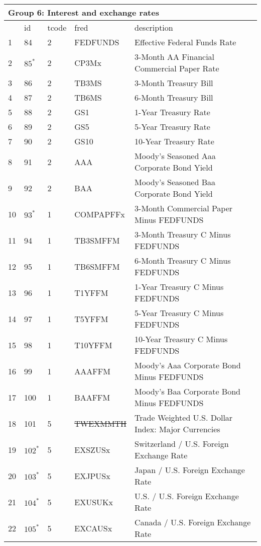 \begin{table}[ht] 
\centering 
\begin{tabular}{lllll}
\multicolumn{5}{l}{Group 6: Interest and exchange rates} \\
\toprule
 & id & tcode & fred & description \\
\midrule
1 & 84 & 2 & FEDFUNDS & Effective Federal Funds Rate \\
2 & $85^*$ & 2 & CP3Mx & 3-Month AA Financial Commercial Paper Rate \\
3 & 86 & 2 & TB3MS & 3-Month Treasury Bill \\
4 & 87 & 2 & TB6MS & 6-Month Treasury Bill \\
5 & 88 & 2 & GS1 & 1-Year Treasury Rate \\
6 & 89 & 2 & GS5 & 5-Year Treasury Rate \\
7 & 90 & 2 & GS10 & 10-Year Treasury Rate \\
8 & 91 & 2 & AAA & Moody's Seasoned Aaa Corporate Bond Yield \\
9 & 92 & 2 & BAA & Moody's Seasoned Baa Corporate Bond Yield \\
10 & $93^*$ & 1 & COMPAPFFx & 3-Month Commercial Paper Minus FEDFUNDS \\
11 & 94 & 1 & TB3SMFFM & 3-Month Treasury C Minus FEDFUNDS \\
12 & 95 & 1 & TB6SMFFM & 6-Month Treasury C Minus FEDFUNDS \\
13 & 96 & 1 & T1YFFM & 1-Year Treasury C Minus FEDFUNDS \\
14 & 97 & 1 & T5YFFM & 5-Year Treasury C Minus FEDFUNDS \\
15 & 98 & 1 & T10YFFM & 10-Year Treasury C Minus FEDFUNDS \\
16 & 99 & 1 & AAAFFM & Moody's Aaa Corporate Bond Minus FEDFUNDS \\
17 & 100 & 1 & BAAFFM & Moody's Baa Corporate Bond Minus FEDFUNDS \\
18 & 101 & 5 & \sout{TWEXMMTH} & Trade Weighted U.S. Dollar Index: Major Currencies \\
19 & $102^*$ & 5 & EXSZUSx & Switzerland / U.S. Foreign Exchange Rate \\
20 & $103^*$ & 5 & EXJPUSx & Japan / U.S. Foreign Exchange Rate \\
21 & $104^*$ & 5 & EXUSUKx & U.S. / U.S. Foreign Exchange Rate \\
22 & $105^*$ & 5 & EXCAUSx & Canada / U.S. Foreign Exchange Rate \\
\bottomrule
\end{tabular}  
\end{table} 